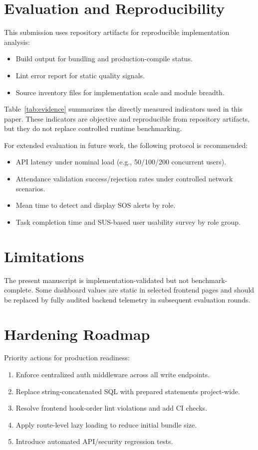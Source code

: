 \documentclass[conference]{IEEEtran}
\begin{document}
\section{Evaluation and Reproducibility}
This submission uses repository artifacts for reproducible implementation analysis:
\begin{itemize}
    \item Build output for bundling and production-compile status.
    \item Lint error report for static quality signals.
    \item Source inventory files for implementation scale and module breadth.
\end{itemize}

Table~\ref{tab:evidence} summarizes the directly measured indicators used in this paper. These indicators are objective and reproducible from repository artifacts, but they do not replace controlled runtime benchmarking.

For extended evaluation in future work, the following protocol is recommended:
\begin{itemize}
    \item API latency under nominal load (e.g., 50/100/200 concurrent users).
    \item Attendance validation success/rejection rates under controlled network scenarios.
    \item Mean time to detect and display SOS alerts by role.
    \item Task completion time and SUS-based user usability survey by role group.
\end{itemize}

\section{Limitations}
The present manuscript is implementation-validated but not benchmark-complete. Some dashboard values are static in selected frontend pages and should be replaced by fully audited backend telemetry in subsequent evaluation rounds.

\section{Hardening Roadmap}
Priority actions for production readiness:
\begin{enumerate}
    \item Enforce centralized auth middleware across all write endpoints.
    \item Replace string-concatenated SQL with prepared statements project-wide.
    \item Resolve frontend hook-order lint violations and add CI checks.
    \item Apply route-level lazy loading to reduce initial bundle size.
    \item Introduce automated API/security regression tests.
\end{enumerate}
\end{document}
